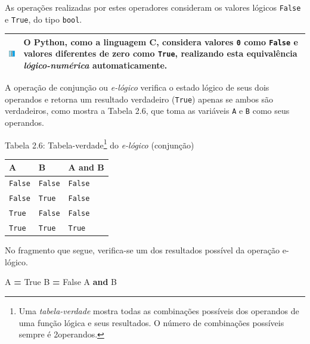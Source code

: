 \documentclass[
]{book}
\newenvironment{Shaded}{\begin{snugshade}}{\end{snugshade}}
\newcommand{\KeywordTok}[1]{\textcolor[rgb]{0.13,0.29,0.53}{\textbf{#1}}}
\newcommand{\NormalTok}[1]{#1}
\newcommand{\OperatorTok}[1]{\textcolor[rgb]{0.81,0.36,0.00}{\textbf{#1}}}
\newcommand{\VariableTok}[1]{\textcolor[rgb]{0.00,0.00,0.00}{#1}}
\begin{document}
As operações realizadas por estes operadores consideram os valores lógicos \texttt{False} e \texttt{True}, do tipo \texttt{bool}.

\begin{longtable}[]{@{}
  >{\centering\arraybackslash}p{}
  >{\raggedright\arraybackslash}p{}@{}}
\toprule
\includegraphics{images/info.png} & O Python, como a linguagem C, considera valores \texttt{0} como \texttt{False} e valores diferentes de zero como \texttt{True}, realizando esta equivalência \emph{lógico-numérica} automaticamente. \\
\midrule
\endhead
\bottomrule
\end{longtable}

A operação de conjunção ou \emph{e-lógico} verifica o estado lógico de seus dois operandos e retorna um resultado verdadeiro (\texttt{True}) apenas se ambos são verdadeiros, como mostra a Tabela 2.6, que toma as variáveis \texttt{A} e \texttt{B} como seus operandos.

Tabela 2.6: Tabela-verdade\footnote{Uma \emph{tabela-verdade} mostra todas as combinações possíveis dos operandos de uma função lógica e seus resultados. O número de combinações possíveis sempre é 2operandos.} do \emph{e-lógico} (conjunção)

\begin{longtable}[]{@{}lll@{}}
\toprule
A & B & A and B \\
\midrule
\endhead
\texttt{False} & \texttt{False} & \texttt{False} \\
\texttt{False} & \texttt{True} & \texttt{False} \\
\texttt{True} & \texttt{False} & \texttt{False} \\
\texttt{True} & \texttt{True} & \texttt{True} \\
\bottomrule
\end{longtable}

No fragmento que segue, verifica-se um dos resultados possível da operação e-lógico.

\begin{Shaded}
\begin{Highlighting}[]
\NormalTok{A }\OperatorTok{=} \VariableTok{True}
\NormalTok{B }\OperatorTok{=} \VariableTok{False}
\NormalTok{A }\KeywordTok{and}\NormalTok{ B}
\end{Highlighting}
\end{Shaded}
\end{document}
